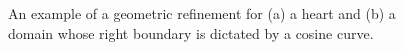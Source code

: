 \documentclass{article}
\begin{document}
\begin{figure}[!htb]
\centering
{}\hfill
{}
\caption{An example of a geometric refinement for (a) a heart and (b) a domain whose right boundary is dictated by a cosine curve.}
\label{geometric_refine}
\end{figure}
\end{document}
